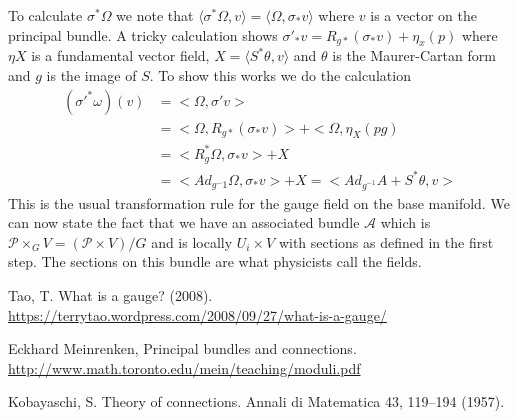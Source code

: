 \documentclass{article}
\theoremstyle{definition}
\begin{document}
    To calculate $\sigma^*\Omega$ we note that $\langle \sigma^*\Omega, v \rangle = \langle \Omega, \sigma_* v\rangle$ where $v$ is a vector on the principal bundle. A tricky calculation shows $\sigma'_*v = R_{g*}(\sigma_{*}v)+\eta_x(p)$ where $\eta X$ is a fundamental vector field, $X = \langle S^*\theta,v \rangle$ and $\theta$ is the Maurer-Cartan form and $g$ is the image of $S$. To show this works we do the calculation 
    \begin{align*}
            (\sigma'^* \omega)(v) & = <\Omega,\sigma'v> \\
            &= <\Omega,R_{g*}(\sigma_*v)>+<\Omega,\eta_X(pg)\\
            &= <R^*_g\Omega,\sigma_*v> +X \\
            &= <Ad_{g^-1}\Omega,\sigma_*v>+X=<Ad_{g^{-1}}A + S^*\theta,v>
    \end{align*}
    This is the usual transformation rule for the gauge field on the base manifold. We can now state the fact that we have an associated bundle $\mathcal A$ which is $\mathcal{P}\times_G V = (\mathcal{P}\times V)/G$ and is locally $U_i \times V$ with sections as defined in the first step. The sections on this bundle are what physicists call the fields.


\begin{thebibliography}{}

\bibitem[]{}
Tao, T. What is a gauge? (2008).\\ \url{https://terrytao.wordpress.com/2008/09/27/what-is-a-gauge/}

\bibitem[]{}
Eckhard Meinrenken, Principal bundles and connections.\\ \url{http://www.math.toronto.edu/mein/teaching/moduli.pdf}


\bibitem[]{}
Kobayaschi, S. Theory of connections. Annali di Matematica 43, 119–194 (1957).

\end{thebibliography}
\end{document}
